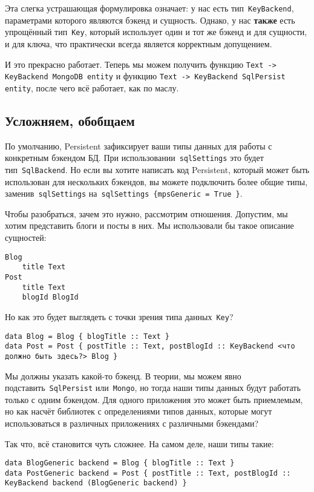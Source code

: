 Эта слегка устрашающая формулировка означает: у нас есть
тип~\lstinline'KeyBackend', параметрами которого являются бэкенд и сущность.
Однако, у нас \textbf{также} есть упрощённый тип~\lstinline'Key', который
использует один и тот же бэкенд и для сущности, и для ключа, что практически
всегда является корректным допущением.

И это прекрасно работает. Теперь мы можем получить функцию
\lstinline'Text -> KeyBackend MongoDB entity' и функцию
\lstinline'Text -> KeyBackend SqlPersist entity', после
чего всё работает, как по маслу.

\subsection{Усложняем, обобщаем}
По умолчанию, Persistent зафиксирует ваши типы данных для работы с конкретным
бэкендом БД. При использовании~\lstinline'sqlSettings' это будет
тип~\lstinline'SqlBackend'. Но если вы хотите написать код Persistent, который
может быть использован для нескольких бэкендов, вы можете подключить более
общие типы, заменив~\lstinline'sqlSettings'
на~\lstinline'sqlSettings {mpsGeneric = True }'.

Чтобы разобраться, зачем это нужно, рассмотрим отношения. Допустим, мы хотим
представить блоги и посты в них. Мы использовали бы такое описание сущностей:

\begin{lstlisting}
Blog
    title Text
Post
    title Text
    blogId BlogId
\end{lstlisting}

Но как это будет выглядеть с точки зрения типа данных~\lstinline'Key'?

\begin{lstlisting}
data Blog = Blog { blogTitle :: Text }
data Post = Post { postTitle :: Text, postBlogId :: KeyBackend <что должно быть здесь?> Blog }
\end{lstlisting}

Мы должны указать какой-то бэкенд. В теории, мы можем явно
подставить~\lstinline'SqlPersist' или~\lstinline'Mongo', но тогда наши типы
данных будут работать только с одним бэкендом. Для одного приложения это может
быть приемлемым, но как насчёт библиотек с определениями типов данных, которые
могут использоваться в различных приложениях с различными бэкендами?

Так что, всё становится чуть сложнее. На самом деле, наши типы такие:

\begin{lstlisting}
data BlogGeneric backend = Blog { blogTitle :: Text }
data PostGeneric backend = Post { postTitle :: Text, postBlogId :: KeyBackend backend (BlogGeneric backend) }
\end{lstlisting}

